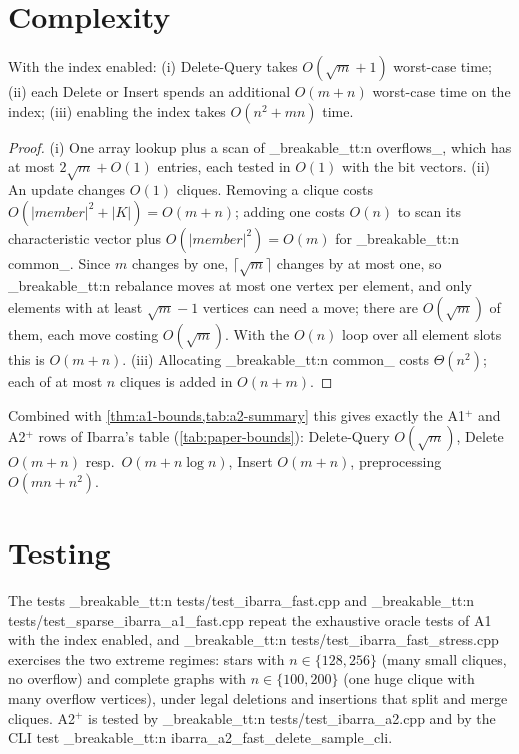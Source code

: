 \documentclass[11pt,a4paper,oneside]{report}
\theoremstyle{plain}
\theoremstyle{definition}
\theoremstyle{remark}
\newcommand{\op}[1]{\textsf{#1}}
\DeclareRobustCommand{\code}[1]{\mtp_breakable_tt:n {#1}}
\DeclareRobustCommand{\file}[1]{\mtp_breakable_tt:n {#1}}
\begin{document}
\section{Complexity}
\begin{proposition}\label{prop:yellin}
With the index enabled: (i) \op{Delete-Query} takes \(O(\sqrt m+1)\) worst-case time;
(ii) each \op{Delete} or \op{Insert} spends an additional \(O(m+n)\) worst-case time on the
index; (iii) enabling the index takes \(O(n^2+mn)\) time.
\end{proposition}
\begin{proof}
(i) One array lookup plus a scan of \code{overflows_}, which has at most \(2\sqrt m+O(1)\)
entries, each tested in \(O(1)\) with the bit vectors.
(ii) An update changes \(O(1)\) cliques. Removing a clique costs
\(O(|\mathit{member}|^2+|K|)=O(m+n)\); adding one costs \(O(n)\) to scan its characteristic
vector plus \(O(|\mathit{member}|^2)=O(m)\) for \code{common_}. Since \(m\) changes by one,
\(\lceil\sqrt m\rceil\) changes by at most one, so \code{rebalance} moves at most one vertex per
element, and only elements with at least \(\sqrt m-1\) vertices can need a move; there are
\(O(\sqrt m)\) of them, each move costing \(O(\sqrt m)\). With the \(O(n)\) loop over all
element slots this is \(O(m+n)\).
(iii) Allocating \code{common_} costs \(\Theta(n^2)\); each of at most \(n\) cliques is added in
\(O(n+m)\).
\end{proof}

Combined with \cref{thm:a1-bounds,tab:a2-summary} this gives exactly the A1\(^+\) and A2\(^+\)
rows of Ibarra's table (\cref{tab:paper-bounds}): \op{Delete-Query} \(O(\sqrt m)\),
\op{Delete} \(O(m+n)\) resp.\ \(O(m+n\log n)\), \op{Insert} \(O(m+n)\), preprocessing
\(O(mn+n^2)\).

\section{Testing}
The tests \file{tests/test_ibarra_fast.cpp} and \file{tests/test_sparse_ibarra_a1_fast.cpp}
repeat the exhaustive oracle tests of A1 with the index enabled, and
\file{tests/test_ibarra_fast_stress.cpp} exercises the two extreme regimes: stars with
\(n\in\{128,256\}\) (many small cliques, no overflow) and complete graphs with
\(n\in\{100,200\}\) (one huge clique with many overflow vertices), under legal deletions and
insertions that split and merge cliques. A2\(^+\) is tested by
\file{tests/test_ibarra_a2.cpp} and by the CLI test \code{ibarra_a2_fast_delete_sample_cli}.
\end{document}
